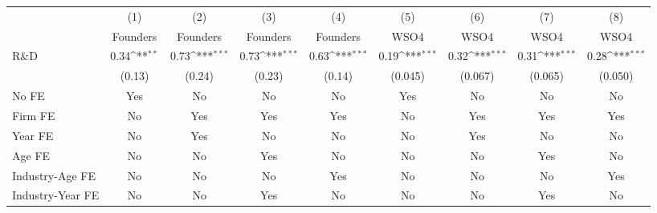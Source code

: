 {
\def\sym#1{\ifmmode^{#1}\else\(^{#1}\)\fi}
\begin{tabular}{l*{8}{c}}
\toprule
                    &\multicolumn{1}{c}{(1)}&\multicolumn{1}{c}{(2)}&\multicolumn{1}{c}{(3)}&\multicolumn{1}{c}{(4)}&\multicolumn{1}{c}{(5)}&\multicolumn{1}{c}{(6)}&\multicolumn{1}{c}{(7)}&\multicolumn{1}{c}{(8)}\\
                    &\multicolumn{1}{c}{Founders}&\multicolumn{1}{c}{Founders}&\multicolumn{1}{c}{Founders}&\multicolumn{1}{c}{Founders}&\multicolumn{1}{c}{WSO4}&\multicolumn{1}{c}{WSO4}&\multicolumn{1}{c}{WSO4}&\multicolumn{1}{c}{WSO4}\\
\midrule
R\&D                &        0.34\sym{**} &        0.73\sym{***}&        0.73\sym{***}&        0.63\sym{***}&        0.19\sym{***}&        0.32\sym{***}&        0.31\sym{***}&        0.28\sym{***}\\
                    &      (0.13)         &      (0.24)         &      (0.23)         &      (0.14)         &     (0.045)         &     (0.067)         &     (0.065)         &     (0.050)         \\
\addlinespace
No FE               &         Yes         &          No         &          No         &          No         &         Yes         &          No         &          No         &          No         \\
\addlinespace
Firm FE             &          No         &         Yes         &         Yes         &         Yes         &          No         &         Yes         &         Yes         &         Yes         \\
\addlinespace
Year FE             &          No         &         Yes         &          No         &          No         &          No         &         Yes         &          No         &          No         \\
\addlinespace
Age FE              &          No         &          No         &         Yes         &          No         &          No         &          No         &         Yes         &          No         \\
\addlinespace
Industry-Age FE     &          No         &          No         &          No         &         Yes         &          No         &          No         &          No         &         Yes         \\
\addlinespace
Industry-Year FE    &          No         &          No         &         Yes         &          No         &          No         &          No         &         Yes         &          No         \\

\end{tabular}}
